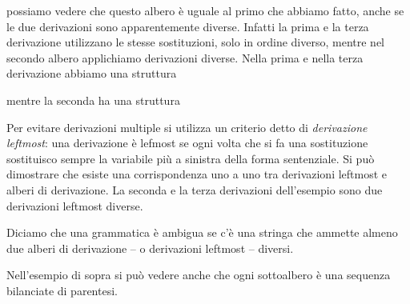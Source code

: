 \documentclass[12pt]{article}
\begin{document}
\begin{tcolorbox}
\begin{center}
	\end{center}
	possiamo vedere che questo albero è uguale al primo che abbiamo fatto, anche se le due derivazioni sono apparentemente diverse.
	Infatti la prima e la terza derivazione utilizzano le stesse sostituzioni, solo in ordine diverso, mentre nel secondo albero applichiamo derivazioni diverse.
	Nella prima e nella terza derivazione abbiamo una struttura
	\begin{center}
	\end{center}
	mentre la seconda ha una struttura
	\begin{center}
	\end{center}
\end{tcolorbox}
Per evitare derivazioni multiple si utilizza un criterio detto di \textit{derivazione leftmost}: una derivazione è lefmost se ogni volta che si fa una sostituzione sostituisco sempre la variabile più a sinistra della forma sentenziale.
Si può dimostrare che esiste una corrispondenza uno a uno tra derivazioni leftmost e alberi di derivazione.
La seconda e la terza derivazioni dell'esempio sono due derivazioni leftmost diverse.

Diciamo che una grammatica è ambigua se c'è una stringa che ammette almeno due alberi di derivazione -- o derivazioni leftmost -- diversi.

Nell'esempio di sopra si può vedere anche che ogni sottoalbero è una sequenza bilanciate di parentesi.
\end{document}
